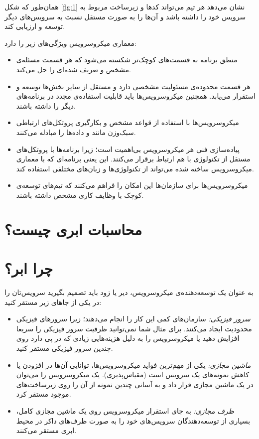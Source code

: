 \documentclass[a4paper,12pt]{book}
\begin{document}
همان‌طور که شکل \ref{fig:1} نشان می‌دهد هر تیم می‌تواند کدها و زیرساخت مربوط به سرویس خود را داشته باشد و آن‌ها را به صورت مستقل نسبت‌ به سرویس‌های دیگر توسعه و ارزیابی کند.

\vskip 0.3cm
معماری میکروسرویس ویژگی‌های زیر را دارد:
\begin{itemize}[label=$\ast$]
		\item  منطق برنامه به قسمت‌های کوچک‌تر شکسته می‌شود که هر قسمت مسئله‌ی مشخص و تعریف شده‌ای را حل می‌کند.
	\item هر قسمت محدوده‌ی مسئولیت مشخصی دارد و مستقل از سایر بخش‌ها توسعه و استقرار می‌یابد. همچنین میکروسرویس‌ها باید قابلیت استفاده‌ی مجدد در برنامه‌های دیگر را داشته باشند.
	\item میکروسرویس‌ها با استفاده از قواعد مشخص و بکارگیری پروتکل‌های ارتباطی سبک‌وزن مانند  و 
	داده‌ها را مبادله می‌کنند.
	\item پیاده‌سازی فنی هر میکروسرویس بی‌اهمیت است؛ زیرا برنامه‌ها با پروتکل‌های مستقل از تکنولوژی
	با هم ارتباط برقرار می‌کنند. این یعنی برنامه‌‌ای که با معماری میکروسرویس ساخته شده می‌تواند از تکنولوژی‌ها و زبان‌های مختلفی استفاده کند. 
	\item میکروسرویس‌ها برای سازمان‌ها این امکان را فراهم می‌کنند که تیم‌های توسعه‌ی کوچک با وظایف کاری مشخص داشته باشند.
\end{itemize} 


\section{محاسبات ابری چیست؟}



\section{چرا ابر؟}

به عنوان یک توسعه‌دهنده‌ی میکروسرویس، دیر یا زود باید تصمیم بگیرید سرویس‌تان را در یکی از جاهای زیر مستقر کنید:
\begin{itemize}[label=$\ast$]
	\item \textit{سرور فیزیکی:} 
	سازمان‌های کمی این کار را انجام می‌دهند؛ زیرا سرورهای فیزیکی محدودیت ایجاد می‌کنند. برای مثال شما نمی‌توانید ظرفیت سرور فیزیکی را سریعا افزایش دهید یا میکروسرویس را به دلیل هزینه‌هایی زیادی که در پی دارد روی چندین سرور فیزیکی مستقر کنید.
	

	\item \textit{ماشین مجازی:}
	یکی از مهم‌ترین فواید میکروسرویس‌ها، توانایی آن‌ها در افزودن یا کاهش نمونه‌های یک سرویس است (مقیاس‌پذیری). یک میکروسرویس  را می‌توان در یک ماشین مجازی قرار داد و به آسانی چندین نمونه از آن را روی زیرساخت‌های موجود مستقر کرد.
	
	\item \textit{ظرف مجازی:} 
	به جای استقرار میکروسرویس ‌روی یک ماشین مجازی کامل، بسیاری از توسعه‌دهندگان سرویس‌های خود را به صورت ظرف‌های داکر
در محیط ابری مستقر می‌کنند. 
\end{itemize}
\end{document}
